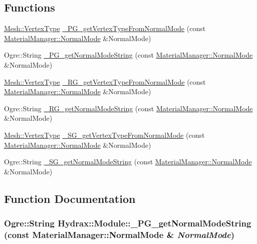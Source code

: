 \subsection*{Functions}
\begin{CompactItemize}
\item 
\hyperlink{class_hydrax_1_1_mesh_5409dc682ec836d1922dc193fc1bf559}{Mesh::VertexType} \hyperlink{namespace_hydrax_1_1_module_07a83b9ab2c8e9cfedcd22c258f195db}{\_\-PG\_\-getVertexTypeFromNormalMode} (const \hyperlink{class_hydrax_1_1_material_manager_aa14689cd1c259f48954dfecda9b296f}{MaterialManager::NormalMode} \&NormalMode)
\item 
Ogre::String \hyperlink{namespace_hydrax_1_1_module_5b60cedd34d9653ac9f5b7c227ba23e6}{\_\-PG\_\-getNormalModeString} (const \hyperlink{class_hydrax_1_1_material_manager_aa14689cd1c259f48954dfecda9b296f}{MaterialManager::NormalMode} \&NormalMode)
\item 
\hyperlink{class_hydrax_1_1_mesh_5409dc682ec836d1922dc193fc1bf559}{Mesh::VertexType} \hyperlink{namespace_hydrax_1_1_module_d1ad011be1214d5b2f3f23d8b2096f5b}{\_\-RG\_\-getVertexTypeFromNormalMode} (const \hyperlink{class_hydrax_1_1_material_manager_aa14689cd1c259f48954dfecda9b296f}{MaterialManager::NormalMode} \&NormalMode)
\item 
Ogre::String \hyperlink{namespace_hydrax_1_1_module_9d0a111b6faa09264b20e9fa08206d1c}{\_\-RG\_\-getNormalModeString} (const \hyperlink{class_hydrax_1_1_material_manager_aa14689cd1c259f48954dfecda9b296f}{MaterialManager::NormalMode} \&NormalMode)
\item 
\hyperlink{class_hydrax_1_1_mesh_5409dc682ec836d1922dc193fc1bf559}{Mesh::VertexType} \hyperlink{namespace_hydrax_1_1_module_5a1e223789b75f6cdc3664affa6872e8}{\_\-SG\_\-getVertexTypeFromNormalMode} (const \hyperlink{class_hydrax_1_1_material_manager_aa14689cd1c259f48954dfecda9b296f}{MaterialManager::NormalMode} \&NormalMode)
\item 
Ogre::String \hyperlink{namespace_hydrax_1_1_module_8a59e685690840e8bfa83fe392c795af}{\_\-SG\_\-getNormalModeString} (const \hyperlink{class_hydrax_1_1_material_manager_aa14689cd1c259f48954dfecda9b296f}{MaterialManager::NormalMode} \&NormalMode)
\end{CompactItemize}


\subsection{Function Documentation}
\hypertarget{namespace_hydrax_1_1_module_5b60cedd34d9653ac9f5b7c227ba23e6}{
\subsubsection[{\_\-PG\_\-getNormalModeString}]{\setlength{\rightskip}{0pt plus 5cm}Ogre::String Hydrax::Module::\_\-PG\_\-getNormalModeString (const MaterialManager::NormalMode \& {\em NormalMode})}}
\label{namespace_hydrax_1_1_module_5b60cedd34d9653ac9f5b7c227ba23e6}



